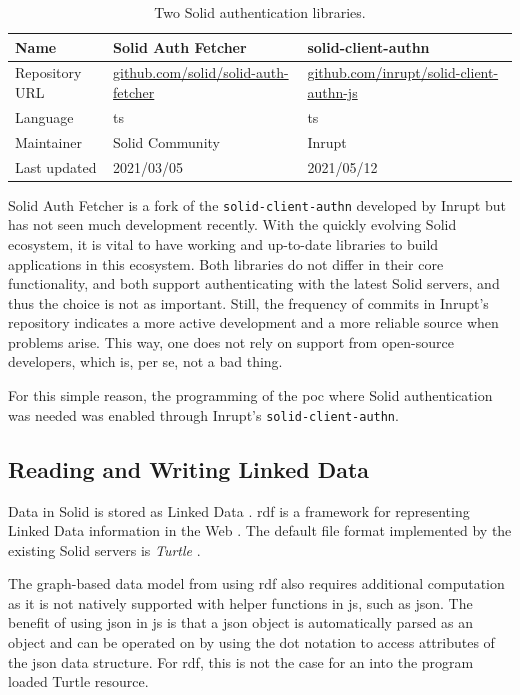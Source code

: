 \begin{table}[h!]
    \centering
    \begin{tabular}{| l | l | l |} 
     \hline
     Name & Solid Auth Fetcher & solid-client-authn \\
     \hline
     Repository URL & \url{github.com/solid/solid-auth-fetcher} & \url{github.com/inrupt/solid-client-authn-js} \\
     \hline
     Language & \gls{ts} & \gls{ts} \\
     \hline
     Maintainer & Solid Community & Inrupt \\
     \hline
     Last updated & 2021/03/05 & 2021/05/12 \\
     \hline
    \end{tabular}
    \vspace{0.75cm}
    \caption{Two Solid authentication libraries.}
    \label{table:0}
\end{table}

Solid Auth Fetcher is a fork of the \texttt{solid-client-authn} developed by Inrupt but has not seen much development recently. With the quickly evolving Solid ecosystem, it is vital to have working and up-to-date libraries to build applications in this ecosystem. Both libraries do not differ in their core functionality, and both support authenticating with the latest Solid servers, and thus the choice is not as important. Still, the frequency of commits in Inrupt's repository indicates a more active development and a more reliable source when problems arise. This way, one does not rely on support from open-source developers, which is, per se, not a bad thing.

For this simple reason, the programming of the \gls{poc} where Solid authentication was needed was enabled through Inrupt's \texttt{solid-client-authn}.

\subsection{Reading and Writing Linked Data}

Data in Solid is stored as Linked Data \cite{Malhotra:15:LDP}. \gls{rdf} is a framework for representing Linked Data information in the Web \cite{Cyganiak:14:RCA}. The default file format implemented by the existing Solid servers is \textit{Turtle} \cite{Prud:hommeaux:14:RT}.

The graph-based data model from using \gls{rdf} also requires additional computation as it is not natively supported with helper functions in \gls{js}, such as \gls{json}. The benefit of using \gls{json} in \gls{js} is that a \gls{json} object is automatically parsed as an object and can be operated on by using the dot notation to access attributes of the \gls{json} data structure. For \gls{rdf}, this is not the case for an into the program loaded Turtle resource.

